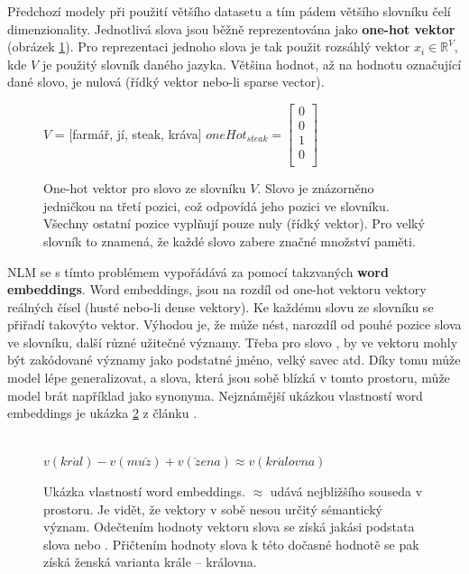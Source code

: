 Předchozí modely při použití většího datasetu a tím pádem většího slovníku čelí  dimenzionality. Jednotlivá slova jsou běžně reprezentována jako \textbf{one-hot vektor} (obrázek \ref{figure:oneHot}). Pro reprezentaci jednoho slova je tak použit rozsáhlý vektor $x_i \in \mathbb{R}^{V}$, kde $V$ je použitý slovník daného jazyka. Většina hodnot, až na hodnotu označující dané slovo, je nulová (řídký vektor nebo-li sparse vector).

\begin{figure}[H]
    \begin{center}
        $V$ = $[$farmář, jí, steak, kráva$]$ \quad
        $
        oneHot_{steak}=
        \begin{bmatrix}
            0 \\
            0 \\
            1 \\
            0 \\
        \end{bmatrix}
        $
    \end{center}
	\caption{One-hot vektor pro slovo  ze slovníku $V$. Slovo je znázorněno jedničkou na třetí pozici, což odpovídá jeho pozici ve slovníku. Všechny ostatní pozice vyplňují pouze nuly (řídký vektor). Pro velký slovník to znamená, že každé slovo zabere značné množství paměti.}
	\label{figure:oneHot}
\end{figure}


NLM se s tímto problémem vypořádává za pomocí takzvaných \textbf{word embeddings}. Word embeddings, jsou na rozdíl od one-hot vektoru vektory reálných čísel (husté nebo-li dense vektory). Ke každému slovu ze slovníku se přiřadí takovýto vektor. Výhodou je, že může nést, narozdíl od pouhé pozice slova ve slovníku, další různé užitečné významy. Třeba pro slovo , by ve vektoru mohly být zakódované významy jako podstatné jméno, velký savec atd. Díky tomu může model lépe generalizovat, a slova, která jsou sobě blízká v tomto prostoru, může model brát například jako synonyma.
Nejznámější ukázkou vlastností word embeddings je ukázka \ref{figure:kingQueen} z článku \cite{kingQueen}. \\\\

\begin{figure}[H]
    \begin{center}
        $
          v(kr\acute{a}l) - v(mu\check{z}) + v(\check{z}ena) \approx v(kr\acute{a}lovna)
        $
    \end{center}
	\caption{Ukázka vlastností word embeddings. $\approx$ udává nejbližšího souseda v prostoru. Je vidět, že vektory v sobě nesou určitý sémantický význam. Odečtením hodnoty vektoru slova  se získá jakási podstata slova  nebo . Přičtením hodnoty slova  k této dočasné hodnotě se pak získá ženská varianta krále -- královna.}
	\label{figure:kingQueen}
\end{figure}


